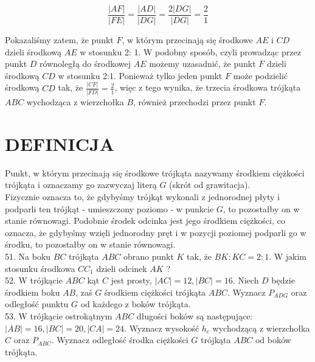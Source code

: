 \documentclass[10pt]{article}
\begin{document}
\[
\frac{|A F|}{|F E|}=\frac{|A D|}{|D G|}=\frac{2|D G|}{|D G|}=\frac{2}{1}
\]

Pokazaliśmy zatem, że punkt \(F\), w którym przecinają się środkowe \(A E\) i \(C D\) dzieli środkową \(A E\) w stosunku 2: 1. W podobny sposób, czyli prowadząc przez punkt \(D\) równoległą do środkowej \(A E\) możemy uzasadnić, że punkt \(F\) dzieli środkową \(C D\) w stosunku 2:1. Ponieważ tylko jeden punkt \(F\) może podzielić środkową \(C D\) tak, że \(\frac{|C F|}{|F D|}=\frac{2}{1}\), więc z tego wynika, że trzecia środkowa trójkąta \(A B C\) wychodząca z wierzchołka \(B\), również przechodzi przez punkt \(F\).

\section*{DEFINICJA}
Punkt, w którym przecinają się środkowe trójkąta nazywamy środkiem ciężkości trójkąta i oznaczamy go zazwyczaj literą \(G\) (skrót od grawitacja).\\
Fizycznie oznacza to, że gdybyśmy trójkąt wykonali z jednorodnej płyty i podparli ten trójkąt - umieszczony poziomo - w punkcie \(G\), to pozostałby on w stanie równowagi. Podobnie środek odcinka jest jego środkiem ciężkości, co oznacza, że gdybyśmy wzięli jednorodny pręt i w pozycji poziomej podparli go w środku, to pozostałby on w stanie równowagi.\\
51. Na boku \(B C\) trójkąta \(A B C\) obrano punkt \(K\) tak, że \(B K: K C=2: 1\). W jakim stosunku środkowa \(C C_{1}\) dzieli odcinek \(A K\) ?\\
52. W trójkącie \(A B C\) kąt \(C\) jest prosty, \(|A C|=12,|B C|=16\). Niech \(D\) będzie środkiem boku \(A B\), zaś \(G\) środkiem ciężkości trójkąta \(A B C\). Wyznacz \(P_{A D G}\) oraz odległość punktu \(G\) od każdego z boków trójkąta.\\
53. W trójkącie ostrokątnym \(A B C\) długości boków są następujące: \(|A B|=16,|B C|=20,|C A|=24\). Wyznacz wysokość \(h_{c}\) wychodzącą z wierzchołka \(C\) oraz \(P_{A B C}\). Wyznacz odległość środka ciężkości \(G\) trójkąta \(A B C\) od boków trójkąta.
\end{document}
